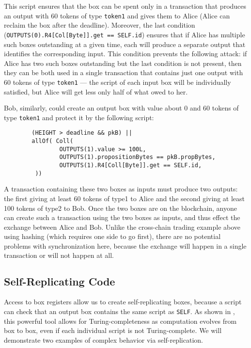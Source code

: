 \documentclass[11pt]{article}
\begin{document}
This script ensures that the box can be spent only in a transaction that produces an output with 60 tokens of type \texttt{token1} and gives them to Alice (Alice can reclaim the box after the deadline).
Moreover, the last condition (\texttt{OUTPUTS(0).R4[Col[Byte]].get == SELF.id}) ensures that if Alice has multiple such boxes outstanding at a given time, each will produce a separate output that identifies the corresponding input. This condition prevents the following attack: if Alice has two such boxes outstanding but the last condition is not present, then they can be both used in a single transaction that contains just one output with 60 tokens of type \texttt{token1} --- the script of each input box will be individually satisfied, but Alice will get less only half of what owed to her.

Bob, similarly, could create an output box with value about 0 and 60 tokens of type \texttt{token1} and protect it by the following script:
\begin{verbatim}
        (HEIGHT > deadline && pkB) ||
        allOf( Coll(
                OUTPUTS(1).value >= 100L,
                OUTPUTS(1).propositionBytes == pkB.propBytes,
                OUTPUTS(1).R4[Coll[Byte]].get == SELF.id,
         ))
\end{verbatim}

A transaction containing these two boxes as inputs must produce two outputs: the first giving at least 60 tokens of type1 to Alice and the second giving at least 100 tokens of type2 to Bob. Once the two boxes are on the blockchain, anyone can create such a transaction using the two boxes as inputs, and thus effect the exchange between Alice and Bob. Unlike the cross-chain trading example above using hashing (which requires one side to go first), there are no potential problems with synchronization here, because the exchange will happen in a single transaction or will not happen at all.
\subsection{Self-Replicating Code}
\label{sec:self-replicating}
Access to box registers allow us to create self-replicating boxes, because a script can check that an output box contains the same script as \texttt{SELF}. As shown in \cite{CKM18}, this powerful tool allows for Turing-completeness as computation evolves from box to box, even if each individual script is not Turing-complete. We will demonstrate two examples of complex behavior via self-replication.
\end{document}

